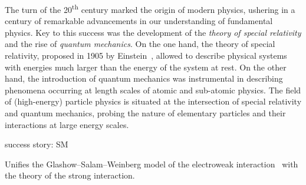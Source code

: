 %
%
%
%
%






The turn of the 20\textsuperscript{th} century marked the origin of modern
physics, ushering in a century of remarkable advancements in our understanding
of fundamental physics. Key to this success was the development of the
\emph{theory of special relativity} and the rise of \emph{quantum mechanics}. On
the one hand, the theory of special relativity, proposed in 1905 by
Einstein~\cite{einstein:1905zedbk,einstein:1905idtekvsea}, allowed to describe
physical systems with energies much larger than the energy of the system at
rest. On the other hand, the introduction of quantum mechanics was instrumental
in describing phenomena occurring at length scales of atomic and sub-atomic
physics. The field of (high-energy) particle physics is situated at the
intersection of special relativity and quantum mechanics, probing the nature of
elementary particles and their interactions at large energy scales.


success story: SM

Unifies the Glashow--Salam--Weinberg model of the electroweak
interaction~\cite{Glashow:1961tr,Salam:1964ry,Weinberg:1967tq} with the theory
of the strong interaction.






